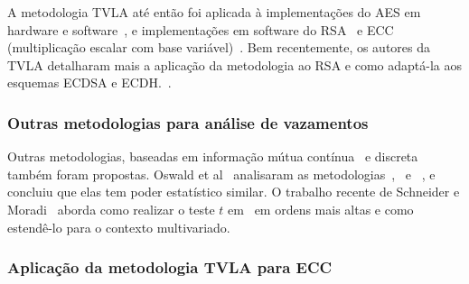 A metodologia TVLA até então foi aplicada à implementações do AES em hardware e software~\cite{Goodwill2011,Cooper2013,MatherOswaldBandenburg2013}, e implementações em software do RSA~\cite{Witteman2011} e ECC (multiplicação escalar com base variável)~\cite{Nascimento2015_Space}. Bem recentemente, os autores da TVLA detalharam mais a aplicação da metodologia ao RSA e como adaptá-la aos esquemas ECDSA e ECDH.~\cite{TunstallGoodwill2016}.

\subsubsection{Outras metodologias para análise de vazamentos}

%
Outras metodologias, baseadas em informação mútua contínua~\cite{Chothia2011} e discreta~\cite{Chatzikokolakis2010} também foram propostas.
%
%
Oswald et al~\cite{MatherOswaldBandenburg2013} analisaram as metodologias~\cite{Goodwill2011},~\cite{Chatzikokolakis2010} e ~\cite{Chothia2011}, e concluiu que elas tem poder estatístico similar.
%
%
O trabalho recente de Schneider e Moradi~\cite{SchneiderMoradi2015} aborda como realizar o teste $t$ em~\cite{Goodwill2011} em ordens mais altas e como estendê-lo para o contexto multivariado.
%
\subsubsection{Aplicação da metodologia TVLA para ECC}

